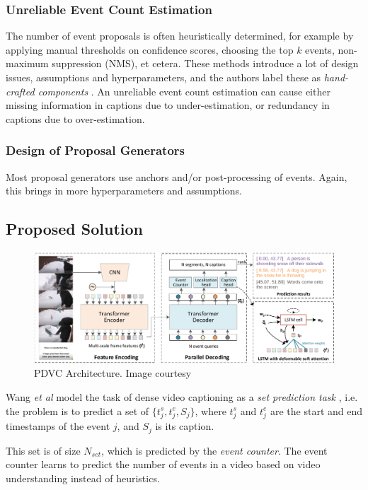 \subsubsection{Unreliable Event Count Estimation} The number of event proposals is often heuristically determined, for example by applying manual thresholds on confidence scores, choosing the top $k$ events, non-maximum suppression (NMS), et cetera. These methods introduce a lot of design issues, assumptions and hyperparameters, and the authors label these as \textit{hand-crafted components} \cite{wang2021endtoend}. An unreliable event count estimation can cause either missing information in captions due to under-estimation, or redundancy in captions due to over-estimation.

\subsubsection{Design of Proposal Generators} Most proposal generators use anchors and/or post-processing of events. Again, this brings in more hyperparameters and assumptions.

\subsection{Proposed Solution}

\begin{figure}
\centering
\includegraphics[width=\linewidth]{assets/img/pdvc/arch.png}
\caption{PDVC Architecture. Image courtesy \cite{wang2021endtoend}}
\end{figure}

\par Wang \textit{et al} model the task of dense video captioning as a \textit{set prediction task} \cite{wang2021endtoend}, i.e. the problem is to predict a set of $\{t_j^s, t_j^e, S_j\}$, where $t_j^s$ and $t_j^e$ are the start and end timestamps of the event $j$, and $S_j$ is its caption. 

\par This set is of size $N_{set}$, which is predicted by the \textit{event counter}. The event counter learns to predict the number of events in a video based on video understanding instead of heuristics.

